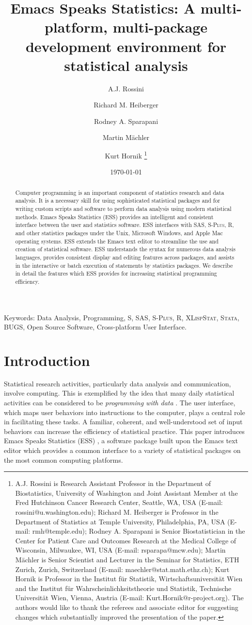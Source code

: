 \documentclass{article}
\title{Emacs Speaks Statistics: A multi-platform, multi-package
  development environment for statistical analysis}
\author{A.J. Rossini \and Richard M. Heiberger \and Rodney A. Sparapani
\and Martin M{\"a}chler \and Kurt Hornik \footnote{%
    A.J. Rossini is Research Assistant Professor in the Department of
    Biostatistics, University of Washington and Joint Assistant Member at
    the Fred Hutchinson Cancer Research Center, Seattle, WA, USA
    (E-mail: rossini@u.washington.edu);
    Richard M. Heiberger is Professor in the Department of Statistics at
    Temple University, Philadelphia, PA, USA (E-mail: rmh@temple.edu);
    Rodney A. Sparapani is Senior Biostatistician in the Center for Patient
    Care and Outcomes Research at the Medical College of Wisconsin,
    Milwaukee, WI, USA (E-mail: rsparapa@mcw.edu);
    Martin M{\"a}chler is Senior Scientist and Lecturer in the Seminar for
    Statistics, ETH Zurich, Zurich, Switzerland
    (E-mail: maechler@stat.math.ethz.ch);
    Kurt Hornik is Professor in the Institut f{\"u}r Statistik,
    Wirtschaftsuniversit{\"a}t Wien and the Institut f{\"u}r
    Wahrscheinlichkeitstheorie und Statistik, Technische
    Universit{\"a}t Wien, Vienna, Austria (E-mail:
    Kurt.Hornik@r-project.org).  The authors would like to thank the
    referees and associate editor for suggesting changes which
    substantially improved the presentation of the paper.}}
\date{\today}
\newif\ifdraft
\renewcommand{\baselinestretch}{1.5}
\newcommand*{\SAS}{\textsc{SAS}}
\newcommand*{\Splus}{\textsc{S-Plus}}
\newcommand*{\XLispStat}{\textsc{XLispStat}}
\newcommand*{\Stata}{\textsc{Stata}}
\begin{document}

\ifdraft
\setcounter{page}{0}
\tableofcontents
\fi

\maketitle

\ifdraft{}%
\else%
 \renewcommand{\baselinestretch}{1.5}
\fi

\begin{abstract}
  Computer programming is an important component of statistics
  research and data analysis.  It is a necessary skill for using
  sophisticated statistical packages and for writing custom scripts
  and software to perform data analysis using modern statistical
  methods.  Emacs Speaks Statistics (ESS) provides an intelligent and
  consistent interface between the user and statistics software.  ESS
  interfaces with \SAS, \Splus, R, and other statistics packages under
  the Unix, Microsoft Windows, and Apple Mac operating systems.  ESS
  extends the Emacs text editor to streamline the use and creation of
  statistical software.  ESS understands the syntax for numerous data
  analysis languages, provides consistent display and editing features
  across packages, and assists in the interactive or batch execution
  of statements by statistics packages.  We describe in detail the
  features which ESS provides for increasing statistical programming
  efficiency.
\end{abstract}

\noindent Keywords: Data Analysis, Programming, S, \SAS, \Splus, R,
\XLispStat, \Stata, BUGS, Open Source Software, Cross-platform User
Interface.

\section{Introduction}
\label{sec:introduction}

Statistical research activities, particularly data analysis and
communication, involve computing.  This is exemplified by the idea
that many daily statistical activities can be considered to be
\textit{programming with data} \citep{ChaJ98}.  The user interface,
which maps user behaviors into instructions to the computer, plays a central
role in facilitating these tasks.  A familiar, coherent, and
well-understood set of input behaviors can increase the efficiency of
statistical practice.  This paper introduces Emacs Speaks Statistics
(ESS) \citep{ESS}, a software package built upon the Emacs text editor
which provides a common interface to a variety of statistical packages
on the most common computing platforms.
\end{document}
